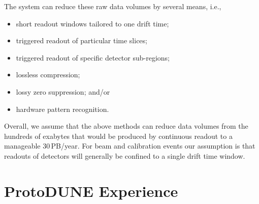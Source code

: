 \documentclass[../main-v1.tex]{subfiles}
\begin{document}
The  system can reduce these raw data volumes by several means, i.e.,
\begin{itemize} 
\item short readout windows tailored to one drift time;
\item triggered readout of particular time slices;
\item triggered readout of specific detector sub-regions; %
\item lossless compression; %
\item lossy zero suppression; and/or
\item hardware pattern recognition.
\end{itemize}


Overall, we assume that the above methods can reduce data volumes from the hundreds of exabytes that would be produced by continuous readout to a manageable 30\,PB/year. For beam and calibration events our assumption is that readouts of  detectors will  generally be confined to a single drift time window.




\section{ProtoDUNE Experience}
\label{sec:est:ProtoDUNE}  
\end{document}
